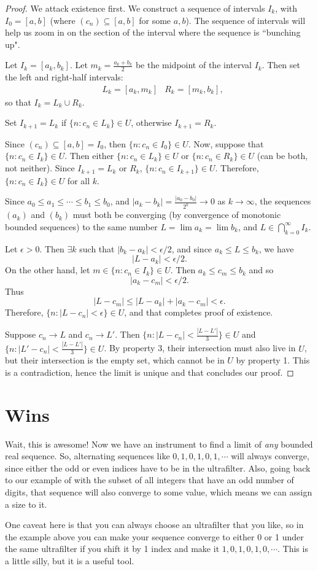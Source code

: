 \documentclass[12pt,reqno]{amsart}
\theoremstyle{plain} %
\theoremstyle{remark}
\theoremstyle{definition}
\newcommand{\e}{\epsilon}
\begin{document}
\begin{proof}
We attack existence first. We construct a sequence of intervals $I_k$, with $I_0 = [a,b]$ (where $(c_n) \subseteq  [a,b]$ for some $a,b$). The sequence of intervals will help us zoom in on the section of the interval where the sequence is ``bunching up". 

Let $I_k = [a_k, b_k]$.  Let $m_k = \frac{a_k+b_k}{2}$ be the midpoint of the interval $I_k$. Then set the left and right-half intervals:
\begin{align*}
&L_k = [a_k, m_k]&        R_k=[m_k,b_k],
\end{align*}
so that $I_k = L_k \cup R_k$.

Set $I_{k+1} = L_k$ if $\{n: c_n \in L_k\}  \in U$, otherwise $I_{k+1}=R_k$. 

Since $(c_n)\subseteq [a,b] = I_0$, then $\{n:c_n \in I_0\} \in U$. Now, suppose that $\{n: c_n \in I_k\} \in U$. Then either $\{n: c_n \in L_k\}  \in U$ or $\{n: c_n \in R_k\}  \in U$ (can be both, not neither). Since $I_{k+1} = L_k$ or $R_k$, $\{n : c_n \in I_{k+1}\} \in U$. Therefore, $\{n:c_n \in I_k\}\in U$ for all $k$.

Since $a_0\leq a_1 \leq \cdots \leq b_1\leq b_0$, and $|a_k-b_k| = \frac{|a_0-b_0|}{2^k}\rightarrow 0$ as $k \rightarrow \infty $, the sequences $(a_k)$ and $(b_k)$ must both be converging (by convergence of monotonic bounded sequences) to the same number $L = \lim a_k = \lim b_k$, and $L \in \bigcap_{k=0}^\infty  I_k$.

Let $\e >0$. Then $\exists k$ such that $|b_k-a_k| < \e/2$, and since $a_k\leq L\leq b_k$, we have \[|L-a_k| < \e/2.\]
On the other hand, let $m \in \{n : c_n \in I_k\} \in U$. Then $a_k\leq c_m \leq b_k$ and so 
\[|a_k-c_m|<\e/2 .\]
Thus \[|L-c_m| \leq |L-a_k|+|a_k-c_m| < \e .\]
Therefore, $\{n : |L-c_n| <\e \} \in U$, and that completes proof of existence.

Suppose $c_n \rightarrow L$ and $c_n \rightarrow L'$. Then $\{n:|L-c_n|<\frac{|L-L'|}{3}\} \in U$ and $\{n:|L'-c_n|<\frac{|L-L'|}{3}\} \in U$. By property 3, their intersection must also live in $U$, but their intersection is the empty set, which cannot be in $U$ by property 1. This is a contradiction, hence the limit is unique and that concludes our proof.
\end{proof}

\section{Wins}
Wait, this is awesome! Now we have an instrument to find a limit of \textit{any} bounded real sequence. So, alternating sequences like $0,1,0,1,0,1, \cdots$ will always converge, since either the odd or even indices have to be in the ultrafilter. Also, going back to our example of with the subset of all integers that have an odd number of digits, that sequence will also converge to some value, which means we can assign a size to it. 

One caveat here is that you can always choose an ultrafilter that you like, so in the example above you can make your sequence converge to either 0 or 1 under the same ultrafilter if you shift it by 1 index and make it $1,0,1,0,1,0,\cdots $. This is a little silly, but it is a useful tool.
\end{document}
